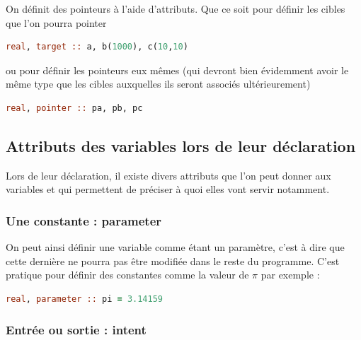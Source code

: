\documentclass[a4paper,twoside]{article}
\begin{document}
On définit des pointeurs à l'aide d'attributs. Que ce soit pour définir les cibles que l'on pourra pointer
\begin{lstlisting}[language=Fortran]
real, target :: a, b(1000), c(10,10)
\end{lstlisting}
ou pour définir les pointeurs eux mêmes (qui devront bien évidemment avoir le même type que les cibles auxquelles ils seront associés ultérieurement)
\begin{lstlisting}[language=Fortran]
real, pointer :: pa, pb, pc
\end{lstlisting}


\subsection{Attributs des variables lors de leur déclaration}
Lors de leur déclaration, il existe divers attributs que l'on peut donner aux variables et qui permettent de préciser à quoi elles vont servir notamment. 

\subsubsection{Une constante : parameter}

On peut ainsi définir une variable comme étant un paramètre, c'est à dire que cette dernière ne pourra pas être modifiée dans le reste du programme. C'est pratique pour définir des constantes comme la valeur de $\pi$ par exemple : 
\begin{lstlisting}[language=Fortran]
real, parameter :: pi = 3.14159
\end{lstlisting}

\subsubsection{Entrée ou sortie : intent}
\end{document}
